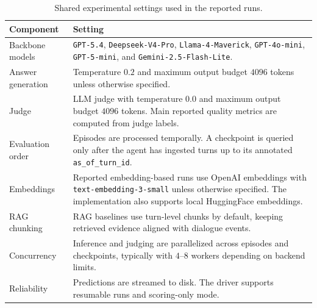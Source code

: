 \documentclass{llmxive}
\providecommand{\arraystretch}{1.22}
\begin{document}
\begin{table}[t]
\centering
\vspace{-3pt}
\begingroup
\footnotesize
\setlength{\tabcolsep}{4.5pt}
\renewcommand{\arraystretch}{1.12}
\begin{tabularx}{\columnwidth}{
@{}
>{\arraybackslash}p{}
>{\arraybackslash}X
@{}}
\toprule
\rowcolor{black!6}
\textbf{Component} & \textbf{Setting} \\
\midrule

Backbone models
& \texttt{GPT-5.4}, \texttt{Deepseek-V4-Pro}, \texttt{Llama-4-Maverick}, \texttt{GPT-4o-mini}, \texttt{GPT-5-mini}, and \texttt{Gemini-2.5-Flash-Lite}. \\

Answer generation
& Temperature $0.2$ and maximum output budget $4096$ tokens unless otherwise specified. \\

Judge
& LLM judge with temperature $0.0$ and maximum output budget $4096$ tokens. Main reported quality metrics are computed from judge labels. \\

Evaluation order
& Episodes are processed temporally. A checkpoint is queried only after the agent has ingested turns up to its annotated \texttt{as\_of\_turn\_id}. \\

Embeddings
& Reported embedding-based runs use OpenAI embeddings with \texttt{text-embedding-3-small} unless otherwise specified. The implementation also supports local HuggingFace embeddings. \\

RAG chunking
& RAG baselines use turn-level chunks by default, keeping retrieved evidence aligned with dialogue events. \\

Concurrency
& Inference and judging are parallelized across episodes and checkpoints, typically with $4$--$8$ workers depending on backend limits. \\

Reliability
& Predictions are streamed to disk. The driver supports resumable runs and scoring-only mode. \\

\bottomrule
\end{tabularx}
\endgroup
\caption{Shared experimental settings used in the reported runs.}
\label{tab:experiment-settings}
\end{table}
\end{document}
